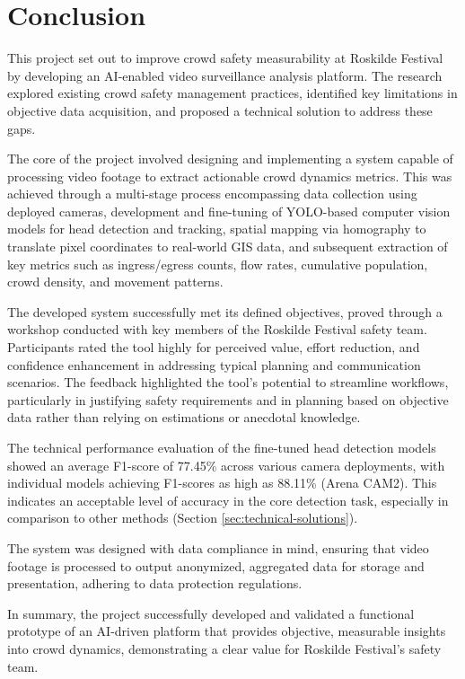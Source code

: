 \chapter{Conclusion}

This project set out to improve crowd safety measurability at Roskilde Festival by developing an AI-enabled video surveillance analysis platform. The research explored existing crowd safety management practices, identified key limitations in objective data acquisition, and proposed a technical solution to address these gaps.

The core of the project involved designing and implementing a system capable of processing video footage to extract actionable crowd dynamics metrics. This was achieved through a multi-stage process encompassing data collection using deployed cameras, development and fine-tuning of YOLO-based computer vision models for head detection and tracking, spatial mapping via homography to translate pixel coordinates to real-world GIS data, and subsequent extraction of key metrics such as ingress/egress counts, flow rates, cumulative population, crowd density, and movement patterns.

The developed system successfully met its defined objectives, proved through a workshop conducted with key members of the Roskilde Festival safety team.  Participants rated the tool highly for perceived value, effort reduction, and confidence enhancement in addressing typical planning and communication scenarios. The feedback highlighted the tool's potential to streamline workflows, particularly in justifying safety requirements and in planning based on objective data rather than relying on estimations or anecdotal knowledge.

The technical performance evaluation of the fine-tuned head detection models showed an average F1-score of 77.45\% across various camera deployments, with individual models achieving F1-scores as high as 88.11\% (Arena CAM2). This indicates an acceptable level of accuracy in the core detection task, especially in comparison to other methods (Section \ref{sec:technical-solutions}).

The system was designed with data compliance in mind, ensuring that video footage is processed to output anonymized, aggregated data for storage and presentation, adhering to data protection regulations.

In summary, the project successfully developed and validated a functional prototype of an AI-driven platform that provides objective, measurable insights into crowd dynamics, demonstrating a clear value for Roskilde Festival's safety team.

